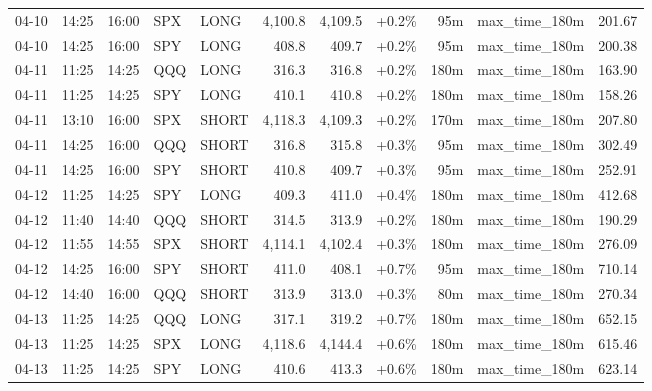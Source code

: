 \documentclass[11pt,a4paper,twoside]{article}
\begin{document}
\begin{center}
\begin{longtable}{>{\color{txtmain}}l l l l l r r r r >{\color{txtmain}}l r}
04-10 & 14:25 & 16:00 & SPX & LONG & 4,100.8 & 4,109.5 & \textcolor{wingreen}{+0.2\%} & 95m & max\_time\_180m & \textcolor{wingreen}{201.67} \\
04-10 & 14:25 & 16:00 & SPY & LONG & 408.8 & 409.7 & \textcolor{wingreen}{+0.2\%} & 95m & max\_time\_180m & \textcolor{wingreen}{200.38} \\
04-11 & 11:25 & 14:25 & QQQ & LONG & 316.3 & 316.8 & \textcolor{wingreen}{+0.2\%} & 180m & max\_time\_180m & \textcolor{wingreen}{163.90} \\
04-11 & 11:25 & 14:25 & SPY & LONG & 410.1 & 410.8 & \textcolor{wingreen}{+0.2\%} & 180m & max\_time\_180m & \textcolor{wingreen}{158.26} \\
04-11 & 13:10 & 16:00 & SPX & SHORT & 4,118.3 & 4,109.3 & \textcolor{wingreen}{+0.2\%} & 170m & max\_time\_180m & \textcolor{wingreen}{207.80} \\
04-11 & 14:25 & 16:00 & QQQ & SHORT & 316.8 & 315.8 & \textcolor{wingreen}{+0.3\%} & 95m & max\_time\_180m & \textcolor{wingreen}{302.49} \\
04-11 & 14:25 & 16:00 & SPY & SHORT & 410.8 & 409.7 & \textcolor{wingreen}{+0.3\%} & 95m & max\_time\_180m & \textcolor{wingreen}{252.91} \\
04-12 & 11:25 & 14:25 & SPY & LONG & 409.3 & 411.0 & \textcolor{wingreen}{+0.4\%} & 180m & max\_time\_180m & \textcolor{wingreen}{412.68} \\
04-12 & 11:40 & 14:40 & QQQ & SHORT & 314.5 & 313.9 & \textcolor{wingreen}{+0.2\%} & 180m & max\_time\_180m & \textcolor{wingreen}{190.29} \\
04-12 & 11:55 & 14:55 & SPX & SHORT & 4,114.1 & 4,102.4 & \textcolor{wingreen}{+0.3\%} & 180m & max\_time\_180m & \textcolor{wingreen}{276.09} \\
04-12 & 14:25 & 16:00 & SPY & SHORT & 411.0 & 408.1 & \textcolor{wingreen}{+0.7\%} & 95m & max\_time\_180m & \textcolor{wingreen}{710.14} \\
04-12 & 14:40 & 16:00 & QQQ & SHORT & 313.9 & 313.0 & \textcolor{wingreen}{+0.3\%} & 80m & max\_time\_180m & \textcolor{wingreen}{270.34} \\
04-13 & 11:25 & 14:25 & QQQ & LONG & 317.1 & 319.2 & \textcolor{wingreen}{+0.7\%} & 180m & max\_time\_180m & \textcolor{wingreen}{652.15} \\
04-13 & 11:25 & 14:25 & SPX & LONG & 4,118.6 & 4,144.4 & \textcolor{wingreen}{+0.6\%} & 180m & max\_time\_180m & \textcolor{wingreen}{615.46} \\
04-13 & 11:25 & 14:25 & SPY & LONG & 410.6 & 413.3 & \textcolor{wingreen}{+0.6\%} & 180m & max\_time\_180m & \textcolor{wingreen}{623.14} \\

\end{longtable}
\end{center}
\end{document}
